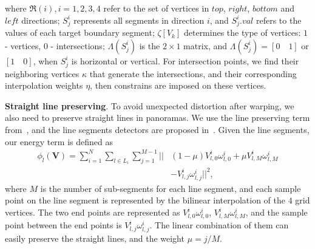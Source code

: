 \documentclass[10pt,journal,compsoc]{IEEEtran}
\begin{document}
where $\Re(i), i=1,2,3,4$ refer to the set of vertices in $top$, $right$, $bottom$ and $left$ directions;
$S^i_j$ represents all segments in direction $i$, and $S^i_j.val$ refers to the values of each target boundary segment;
$\zeta[V_k]$ determines the type of vertices: $1$ - vertices, $0$ - intersections;
$\Lambda(S^i_j)$ is the $2\times1$ matrix, and $\Lambda(S^i_j)=[0\quad 1] $ or $[1\quad 0]$, when $S^i_j$ is horizontal or vertical.
For intersection points, we find their neighboring vertices $\kappa$ that generate the intersections, and their corresponding interpolation weights $\eta$,
then constrains are imposed on these vertices.

\textbf{Straight line preserving}.
To avoid unexpected distortion after warping, we also need to preserve straight lines in panoramas.
We use the line preserving term from~\cite{journals/cgf/LinLCZ16}, and the line segments detectors are proposed in~\cite{journals/pami/GioiJMR10}.
Given the line segments, our energy term is defined as
\begin{equation} \label{equ:line_preserving}
\begin{split}
    \phi_l(\mathbf{V}) = \sum\limits_{i=1}^N\sum\limits_{l \in L_i}\sum\limits_{j=1}^{M-1}||&(1-\mu)V_{l, 0}^i \omega_{l, 0}^i + \mu V_{l, M}^i \omega_{l, M}^i\\
    &-V_{l, j}^i \omega_{l, j}^i||^2,
\end{split}
\end{equation}
where $M$ is the number of sub-segments for each line segment, and each sample point on the line segment is represented by the bilinear interpolation of the $4$ grid vertices. The two end points are represented as $V_{l, 0}^i \omega_{l, 0}^i$, $V_{l, M}^i \omega_{l, M}^i$, and the sample point between the end points is $V_{l, j}^i \omega_{l, j}^i$.
The linear combination of them can easily preserve the straight lines, and the weight $\mu=j/M$.
\end{document}
